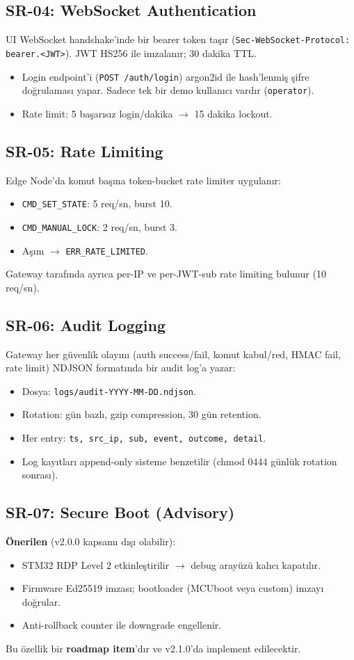 \subsection{SR-04: WebSocket Authentication}
UI WebSocket handshake'inde bir bearer token taşır (\texttt{Sec-WebSocket-Protocol: bearer.<JWT>}). JWT HS256 ile imzalanır; 30 dakika TTL.
\begin{itemize}
    \item Login endpoint'i (\texttt{POST /auth/login}) argon2id ile hash'lenmiş şifre doğrulaması yapar. Sadece tek bir demo kullanıcı vardır (\texttt{operator}).
    \item Rate limit: 5 başarısız login/dakika $\rightarrow$ 15 dakika lockout.
\end{itemize}

\subsection{SR-05: Rate Limiting}
Edge Node'da komut başına token-bucket rate limiter uygulanır:
\begin{itemize}
    \item \texttt{CMD\_SET\_STATE}: 5 req/sn, burst 10.
    \item \texttt{CMD\_MANUAL\_LOCK}: 2 req/sn, burst 3.
    \item Aşım $\rightarrow$ \texttt{ERR\_RATE\_LIMITED}.
\end{itemize}
Gateway tarafında ayrıca per-IP ve per-JWT-sub rate limiting bulunur (10 req/sn).

\subsection{SR-06: Audit Logging}
Gateway her güvenlik olayını (auth success/fail, komut kabul/red, HMAC fail, rate limit) NDJSON formatında bir audit log'a yazar:
\begin{itemize}
    \item Dosya: \texttt{logs/audit-YYYY-MM-DD.ndjson}.
    \item Rotation: gün bazlı, gzip compression, 30 gün retention.
    \item Her entry: \texttt{ts, src\_ip, sub, event, outcome, detail}.
    \item Log kayıtları append-only sisteme benzetilir (chmod 0444 günlük rotation sonrası).
\end{itemize}

\subsection{SR-07: Secure Boot (Advisory)}
\textbf{Önerilen} (v2.0.0 kapsamı dışı olabilir):
\begin{itemize}
    \item STM32 RDP Level 2 etkinleştirilir $\rightarrow$ debug arayüzü kalıcı kapatılır.
    \item Firmware Ed25519 imzası; bootloader (MCUboot veya custom) imzayı doğrular.
    \item Anti-rollback counter ile downgrade engellenir.
\end{itemize}
Bu özellik bir \textbf{roadmap item}'dır ve v2.1.0'da implement edilecektir.

